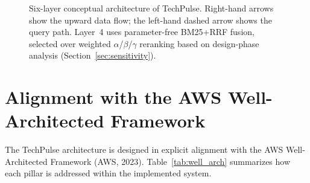 \begin{figure}[H]
{%
}
\caption{Six-layer conceptual architecture of TechPulse. Right-hand arrows show the upward data flow; the left-hand dashed arrow shows the query path. Layer~4 uses parameter-free BM25+RRF fusion, selected over weighted $\alpha$/$\beta$/$\gamma$ reranking based on design-phase analysis (Section~\ref{sec:sensitivity}).}
\label{fig:six_layers}
\end{figure}

\section{Alignment with the AWS Well-Architected Framework}
\label{sec:well_architected}

The TechPulse architecture is designed in explicit alignment with the AWS Well-Architected Framework (AWS, 2023). Table~\ref{tab:well_arch} summarizes how each pillar is addressed within the implemented system.

